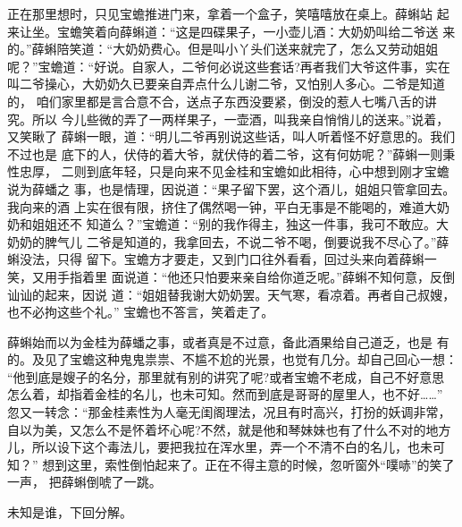 正在那里想时，只见宝蟾推进门来，拿着一个盒子，笑嘻嘻放在桌上。薛蝌站
起来让坐。宝蟾笑着向薛蝌道：“这是四碟果子，一小壶儿酒：大奶奶叫给二爷送
来的。”薛蝌陪笑道：“大奶奶费心。但是叫小丫头们送来就完了，怎么又劳动姐姐
呢？”宝蟾道：“好说。自家人，二爷何必说这些套话?再者我们大爷这件事，实在
叫二爷操心，大奶奶久已要亲自弄点什么儿谢二爷，又怕别人多心。二爷是知道的，
咱们家里都是言合意不合，送点子东西没要紧，倒没的惹人七嘴八舌的讲究。所以
今儿些微的弄了一两样果子，一壶酒，叫我亲自悄悄儿的送来。”说着，又笑瞅了
薛蝌一眼，道：“明儿二爷再别说这些话，叫人听着怪不好意思的。我们不过也是
底下的人，伏侍的着大爷，就伏侍的着二爷，这有何妨呢？”薛蝌一则秉性忠厚，
二则到底年轻，只是向来不见金桂和宝蟾如此相待，心中想到刚才宝蟾说为薛蟠之
事，也是情理，因说道：“果子留下罢，这个酒儿，姐姐只管拿回去。我向来的酒
上实在很有限，挤住了偶然喝一钟，平白无事是不能喝的，难道大奶奶和姐姐还不
知道么？”宝蟾道：“别的我作得主，独这一件事，我可不敢应。大奶奶的脾气儿
二爷是知道的，我拿回去，不说二爷不喝，倒要说我不尽心了。”薛蝌没法，只得
留下。宝蟾方才要走，又到门口往外看看，回过头来向着薛蝌一笑，又用手指着里
面说道：“他还只怕要来亲自给你道乏呢。”薛蝌不知何意，反倒讪讪的起来，因说
道：“姐姐替我谢大奶奶罢。天气寒，看凉着。再者自己叔嫂，也不必拘这些个礼。”
宝蟾也不答言，笑着走了。

薛蝌始而以为金桂为薛蟠之事，或者真是不过意，备此酒果给自己道乏，也是
有的。及见了宝蟾这种鬼鬼祟祟、不尴不尬的光景，也觉有几分。却自己回心一想：
“他到底是嫂子的名分，那里就有别的讲究了呢?或者宝蟾不老成，自己不好意思
怎么着，却指着金桂的名儿，也未可知。然而到底是哥哥的屋里人，也不好……”
忽又一转念：“那金桂素性为人毫无闺阁理法，况且有时高兴，打扮的妖调非常，
自以为美，又怎么不是怀着坏心呢?不然，就是他和琴妹妹也有了什么不对的地方
儿，所以设下这个毒法儿，要把我拉在浑水里，弄一个不清不白的名儿，也未可知？”
想到这里，索性倒怕起来了。正在不得主意的时候，忽听窗外“噗哧”的笑了一声，
把薛蝌倒唬了一跳。

未知是谁，下回分解。